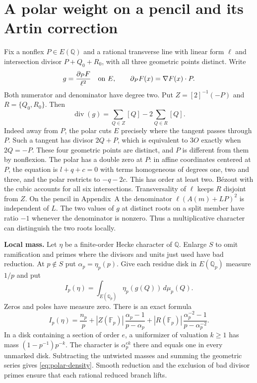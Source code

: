 \documentclass[11pt]{article}
\begin{document}
\section{A polar weight on a pencil and its Artin correction}
\label{app:polar}
Fix a nonflex $P\in E(\mathbb Q)$ and a rational transverse line with
linear form $\ell$ and intersection divisor $P+Q_0+R_0$, with all
three geometric points distinct. Write
\[
 g=\frac{\partial_P F}{\ell^2}\quad\hbox{on }E,\qquad
 \partial_P F(x)=\nabla F(x)\cdot P .
\]
Both numerator and denominator have degree two. Put
$Z=[2]^{-1}(-P)$ and $R=\{Q_0,R_0\}$. Then
\[
                 \operatorname{div}(g)=\sum_{Q\in Z}[Q]
                                  -2\sum_{Q\in R}[Q].
\]
Indeed away from $P$, the polar cuts $E$ precisely where the
tangent passes through $P$. Such a tangent has divisor $2Q+P$, which
is equivalent to $3O$ exactly when $2Q=-P$. These four geometric
points are distinct, and $P$ is different from them by nonflexion.
The polar has a double zero at $P$: in affine coordinates centered at
$P$, the equation is $l+q+c=0$ with terms homogeneous of degrees
one, two and three, and the polar restricts to $-q-2c$.
This has order at least two. B\'ezout with the cubic accounts for all
six intersections. Transversality of $\ell$ keeps $R$ disjoint from
$Z$. On the pencil in Appendix~A the denominator $\ell(A(m)+LP)^2$
is independent of $L$. The two values of $g$ at distinct roots on a
split member have ratio $-1$ whenever the denominator is nonzero.
Thus a multiplicative character can distinguish the two roots locally.

\medskip
\noindent\textbf{Local mass.}
Let $\eta$ be a finite-order Hecke character of $\mathbb Q$. Enlarge
$S$ to omit ramification and primes where the divisors and units just
used have bad reduction. At $p\notin S$ put $\alpha_p=\eta_p(p)$.
Give each residue disk in $E(\mathbb Q_p)$ measure $1/p$ and put
\[
 I_p(\eta)=\int_{E(\mathbb Q_p)}\eta_p(g(Q))\,d\mu_p(Q).
\]
Zeros and poles have measure zero. There is an exact formula
\begin{equation}\label{eq:polar-density}
 I_p(\eta)=\frac{n_p}{p}
 +|Z(\mathbb F_p)|\,\frac{\alpha_p-1}{p-\alpha_p}
 +|R(\mathbb F_p)|\,\frac{\alpha_p^{-2}-1}{p-\alpha_p^{-2}}.
\end{equation}
In a disk containing a section of order $e$, a uniformizer of
valuation $k\ge1$ has mass $(1-p^{-1})p^{-k}$. The character is
$\alpha_p^{ek}$ there and equals one in every unmarked disk.
Subtracting the untwisted masses and summing the geometric series
gives \eqref{eq:polar-density}. Smooth reduction and the exclusion
of bad divisor primes ensure that each rational reduced branch lifts.
\end{document}
